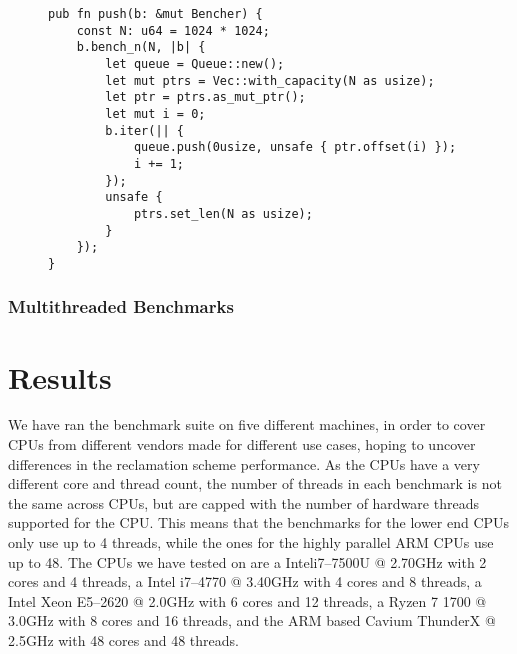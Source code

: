 \documentclass[b5paper]{report}
\begin{document}
\begin{figure}[ht]
  \begin{lstlisting}[caption=Microbenchmark of a data structure without memory
  reclamation,label=lst:bench-nothing]
pub fn push(b: &mut Bencher) {
    const N: u64 = 1024 * 1024;
    b.bench_n(N, |b| {
        let queue = Queue::new();
        let mut ptrs = Vec::with_capacity(N as usize);
        let ptr = ptrs.as_mut_ptr();
        let mut i = 0;
        b.iter(|| {
            queue.push(0usize, unsafe { ptr.offset(i) });
            i += 1;
        });
        unsafe {
            ptrs.set_len(N as usize);
        }
    });
}
  \end{lstlisting}
\end{figure}


\subsection{Multithreaded Benchmarks}




\chapter{Results}\label{ch:results}

We have ran the benchmark suite on five different machines, in order to cover
CPUs from different vendors made for different use cases, hoping to uncover
differences in the reclamation scheme performance. As the CPUs have a very
different core and thread count, the number of threads in each benchmark is not
the same across CPUs, but are capped with the number of hardware threads
supported for the CPU\@. This means that the benchmarks for the lower end CPUs
only use up to 4 threads, while the ones for the highly parallel ARM CPUs use up
to 48.  The CPUs we have tested on are a
Intel\textregistered{}i7--7500U @ 2.70GHz with 2 cores and 4 threads, a
Intel\textregistered{} i7--4770 @ 3.40GHz with 4 cores and 8 threads, a
Intel\textregistered{} Xeon\textregistered{} E5--2620 @ 2.0GHz with 6 cores and
12 threads, a Ryzen 7 1700 @ 3.0GHz with 8 cores and 16 threads, and the ARM
based Cavium ThunderX @ 2.5GHz with 48 cores and 48 threads.
\end{document}
